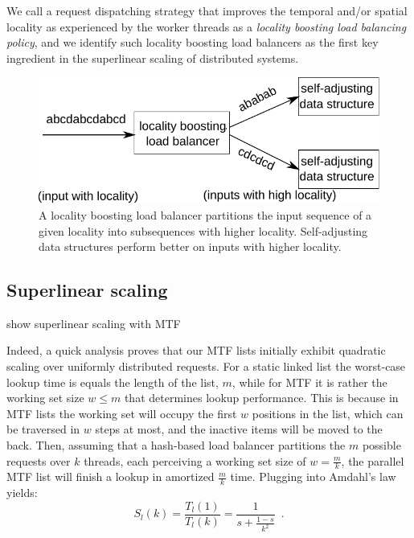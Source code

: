 We call a request dispatching strategy that improves the temporal and\slash or spatial locality as experienced by the worker threads as a \emph{locality boosting load balancing policy}, and we identify such locality boosting load balancers as the first key ingredient in the superlinear scaling of distributed systems.

\begin{figure}
  \centering
  \includegraphics[width=.85\linewidth]{fig/schema.pdf}
  \caption{A locality boosting load balancer partitions the input sequence of a given locality into
    subsequences with higher locality. Self-adjusting data structures perform better on inputs with
    higher locality.}
  \label{fig:locality-boosting-lb}
\end{figure}

\subsection{Superlinear scaling}
\label{sec:arch-scaling}


show superlinear scaling with MTF

Indeed, a quick analysis proves that our MTF lists initially exhibit quadratic scaling over uniformly distributed requests. For a static linked list the worst-case lookup time is equals the length of the list, $m$, while for MTF it is rather the working set size $w\le m$ that determines lookup performance. This is because in MTF lists the working set will occupy the first $w$ positions in the list, which can be traversed in $w$ steps at most, and the inactive items will be moved to the back. Then, assuming that a hash-based load balancer partitions the $m$ possible requests over $k$ threads, each perceiving a working set size of $w=\frac{m}{k}$, the parallel MTF list will finish a lookup in amortized $\frac{m}{k}$ time. Plugging into Amdahl's law yields:
\begin{equation}\label{eq:mtf-perf}
  S_l(k) = \frac{T_l(1)}{T_l(k)} = \frac1{s + \frac{1-s}{k^2}} \enspace .
\end{equation}

